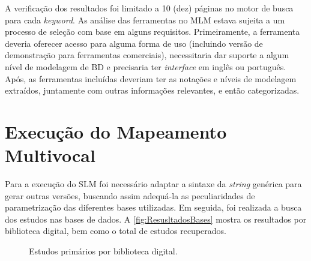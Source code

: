 A verificação dos resultados foi limitado a 10 (dez) páginas no motor de busca para cada \textit{keyword}. 
As análise das ferramentas no \ac{MLM} estava sujeita a um processo de seleção com base em alguns requisitos.
Primeiramente, a ferramenta deveria oferecer acesso para alguma forma de uso (incluindo versão de demonstração para ferramentas comerciais), necessitaria dar suporte a algum nível de modelagem de \ac{BD} e precisaria ter \textit{interface} em inglês ou português. 
Após, as ferramentas incluídas deveriam ter as notações e níveis de modelagem extraídos, juntamente com outras informações relevantes, e então categorizadas.

\section{Execução do Mapeamento Multivocal} \label{sec:ExecMapeamento}

Para a execução do \ac{SLM} foi necessário adaptar a sintaxe da \textit{string} genérica para gerar outras versões, buscando assim adequá-la as peculiaridades de parametrização das diferentes bases utilizadas. 
Em seguida, foi realizada a busca dos estudos nas bases de dados. 
A \autoref{fig:ResusltadosBases} mostra os resultados por biblioteca digital, bem como o total de estudos recuperados.

\begin{figure}[!htb]
	\centering
	    \caption{Estudos primários por biblioteca digital.}
        
	\label{fig:ResusltadosBases}
\end{figure}


